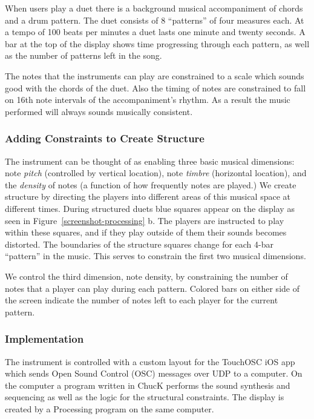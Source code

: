 \documentclass{article}
\begin{document}
When users play a duet there is a background musical accompaniment of chords and a drum pattern.  The duet consists of 8 ``patterns'' of four measures each.  At a tempo of 100 beats per minutes a duet lasts one minute and twenty seconds.  A bar at the top of the display shows time progressing through each pattern, as well as the number of patterns left in the song.  

The notes that the instruments can play are constrained to a scale which sounds good with the chords of the duet.  Also the timing of notes are constrained to fall on 16th note intervals of the accompaniment's rhythm.  As a result the music performed will always sounds musically consistent.

\subsubsection{Adding Constraints to Create Structure}

The instrument can be thought of as enabling three basic musical dimensions: note \emph{pitch} (controlled by vertical location), note \emph{timbre} (horizontal location), and the \emph{density} of notes (a function of how frequently notes are played.)  We create structure by directing the players into different areas of this musical space at different times. During structured duets blue squares appear on the display as seen in Figure~\ref{screenshot-processing} b.  The players are instructed to play within these squares, and if they play outside of them their sounds becomes distorted. The boundaries of the structure squares change for each 4-bar “pattern” in the music. This serves to constrain the first two musical dimensions.

We control the third dimension, note density, by constraining the number of notes that a player can play during each pattern. Colored bars on either side of the screen indicate the number of notes left to each player for the current pattern.


\subsubsection{Implementation}

The instrument is controlled with a custom layout for the TouchOSC iOS app which sends Open Sound Control (OSC) messages over UDP to a computer.  On the computer a program written in ChucK performs the sound synthesis and sequencing as well as the logic for the structural constraints. The display is created by a Processing program on the same computer.
\end{document}
